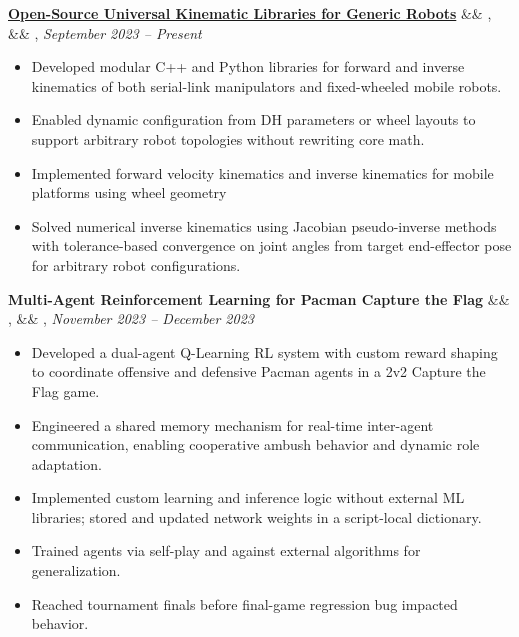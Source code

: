 \documentclass[letterpaper,10pt]{article}
\newcommand{\experience}[5]{%
    \noindent\textbf{#1}%
    \ifx&#2&
    \else
        , \textit{#2}%
    \fi
    \ifx&#3&
    \else
        , #3%
    \fi
    \hfill \textit{#4} \\
    \vspace{-6.8mm}%
    \begin{itemize}[itemsep=-5pt]
        \setlength{\itemindent}{0em}
        #5
    \end{itemize}
    \vspace{1mm}
}
\begin{document}
\experience
    {\href{https://ryanbarry.me/projects/robotics/kinematics/}{Open-Source Universal Kinematic Libraries for Generic Robots}}
    {}
    {}
    {September 2023 – Present}
    {
        \item Developed modular C++ and Python libraries for forward and inverse kinematics of both serial-link manipulators and fixed-wheeled mobile robots.
        \item Enabled dynamic configuration from DH parameters or wheel layouts to support arbitrary robot topologies without rewriting core math.
        \item Implemented forward velocity kinematics and inverse kinematics for mobile platforms using wheel geometry
        \item Solved numerical inverse kinematics using Jacobian pseudo-inverse methods with tolerance-based convergence on joint angles from target end-effector pose for arbitrary robot configurations.
        
    }
    
\experience
    {Multi-Agent Reinforcement Learning for Pacman Capture the Flag}
    {}
    {}
    {November 2023 – December 2023}
    {
        \item Developed a dual-agent Q-Learning RL system with custom reward shaping to coordinate offensive and defensive Pacman agents in a 2v2 Capture the Flag game.
        \item Engineered a shared memory mechanism for real-time inter-agent communication, enabling cooperative ambush behavior and dynamic role adaptation.
        \item Implemented custom learning and inference logic without external ML libraries; stored and updated network weights in a script-local dictionary.
        \item Trained agents via self-play and against external algorithms for generalization.
        \item Reached tournament finals before final-game regression bug impacted behavior.
    }
\end{document}
